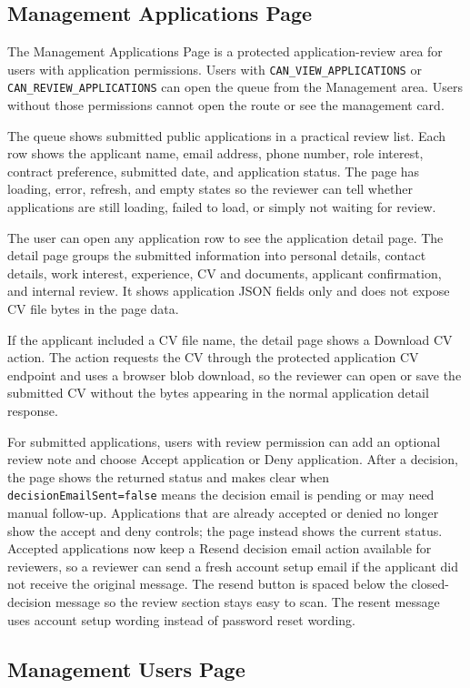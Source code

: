 \documentclass[11pt]{article}
\newcommand{\code}[1]{\nolinkurl{#1}}
\begin{document}
\subsection{Management Applications Page}

The Management Applications Page is a protected application-review area for users with application permissions. Users with \code{CAN_VIEW_APPLICATIONS} or \code{CAN_REVIEW_APPLICATIONS} can open the queue from the Management area. Users without those permissions cannot open the route or see the management card.

The queue shows submitted public applications in a practical review list. Each row shows the applicant name, email address, phone number, role interest, contract preference, submitted date, and application status. The page has loading, error, refresh, and empty states so the reviewer can tell whether applications are still loading, failed to load, or simply not waiting for review.

The user can open any application row to see the application detail page. The detail page groups the submitted information into personal details, contact details, work interest, experience, CV and documents, applicant confirmation, and internal review. It shows application JSON fields only and does not expose CV file bytes in the page data.

If the applicant included a CV file name, the detail page shows a Download CV action. The action requests the CV through the protected application CV endpoint and uses a browser blob download, so the reviewer can open or save the submitted CV without the bytes appearing in the normal application detail response.

For submitted applications, users with review permission can add an optional review note and choose Accept application or Deny application. After a decision, the page shows the returned status and makes clear when \code{decisionEmailSent=false} means the decision email is pending or may need manual follow-up. Applications that are already accepted or denied no longer show the accept and deny controls; the page instead shows the current status. Accepted applications now keep a Resend decision email action available for reviewers, so a reviewer can send a fresh account setup email if the applicant did not receive the original message. The resend button is spaced below the closed-decision message so the review section stays easy to scan. The resent message uses account setup wording instead of password reset wording.
\subsection{Management Users Page}
\end{document}
